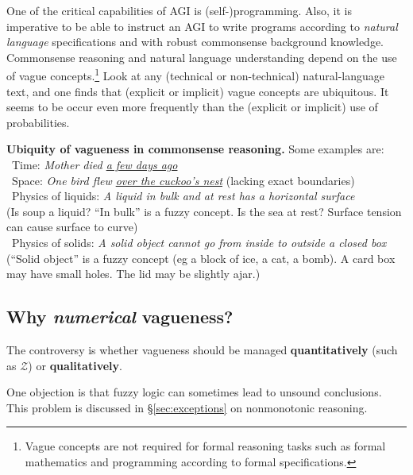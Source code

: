 One of the critical capabilities of AGI is (self-)programming.  Also, it is imperative to be able to instruct an AGI to write programs according to \textit{natural language} specifications and with robust commonsense background knowledge.  Commonsense reasoning and natural language understanding depend on the use of vague concepts.\footnote{Vague concepts are not required for formal reasoning tasks such as formal mathematics and programming according to formal specifications.}  Look at any (technical or non-technical) natural-language text, and one finds that (explicit or implicit) vague concepts are ubiquitous.  It seems to be occur even more frequently than the (explicit or implicit) use of probabilities.

\textbf{Ubiquity of vagueness in commonsense reasoning.}  Some examples are:\\
\textbullet \, Time: \textit{Mother died \underline{a few days ago}}\\
\textbullet \, Space: \textit{One bird flew \underline{over the cuckoo's nest}} \hspace*{0.5cm} (lacking exact boundaries)\\
\textbullet \, Physics of liquids: \textit{A liquid in bulk and at rest has a horizontal surface}\\ (Is soup a liquid? ``In bulk'' is a fuzzy concept. Is the sea at rest? Surface tension can cause surface to curve)\\
\textbullet \, Physics of solids: \textit{A solid object cannot go from inside to outside a closed box}\\  (``Solid object'' is a fuzzy concept (eg a block of ice, a cat, a bomb). A card box may have small holes. The lid may be slightly ajar.)

\subsection{Why \textit{numerical} vagueness?}

The controversy is whether vagueness should be managed \textbf{quantitatively} (such as $\mathcal{Z}$) or \textbf{qualitatively}.

One objection is that fuzzy logic can sometimes lead to unsound conclusions.  This problem is discussed in \S\ref{sec:exceptions} on nonmonotonic reasoning.

